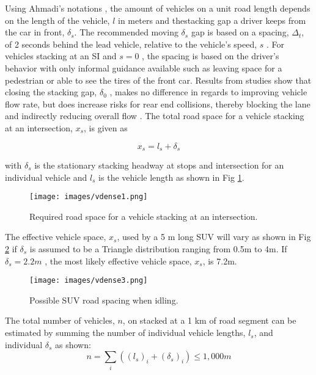 Using Ahmadi's notations \citep{Ahmadi2017}, the amount of vehicles on a unit road length depends on the length of the vehicle, $l$ in meters and thestacking gap a driver keeps from the car in front, $\delta_{s}$.  The recommended moving $\delta_{s}$ gap is based on a spacing, $\Delta_{t}$, of 2 seconds behind the lead vehicle, relative to the vehicle's speed, $s$ \citep{NYDMV2015, ukdot2017}.  For vehicles stacking at an SI and $s=0$ , the spacing is based on the driver's behavior with only informal guidance available such as leaving space for a pedestrian or able to see the tires of the front car. Results from studies show that closing the stacking gap, $\delta_{0}$ , makes no difference in regards to improving vehicle flow rate, but does increase risks for rear end collisions, thereby blocking the lane and indirectly reducing overall flow \citep{Ahmadhi2017}. The total road space for a vehicle stacking at an intersection, $x_{s}$, is given as

\begin{equation}
\label{eq:roadspace}
x_{s}= l_{s} +\delta_{s}
\end{equation}

\noindent
with $\delta_{s}$ is the stationary stacking  headway at stops and intersection for an individual vehicle and $l_{s}$ is the vehicle length as shown in Fig \ref{fig1:roadspace}.

\begin{figure}[H]
\texttt{[image: images/vdense1.png]} 
\caption{Required road space for a vehicle stacking at an intersection.}
\label{fig1:roadspace}
\end{figure}
%
 The effective vehicle space, $x_{s}$, used by a 5 m long SUV will vary as shown in Fig \ref{fig3:SUVspace} if $\delta_{s}$ is assumed to be a Triangle distribution ranging from 0.5m to 4m.  If $\delta_{s} = 2.2m$ , the most likely effective vehicle space, $x_{s}$,  is  7.2m.
%
\begin{figure}[H]
\texttt{[image: images/vdense3.png]} 
\caption{Possible SUV road spacing when idling.}
\label{fig3:SUVspace}
\end{figure}
%

The total number of vehicles, $n$, on stacked at a 1 km of road segment can be estimated by summing the number of individual vehicle lengths, $l_{s}$, and individual $\delta_{s}$ as shown:
% 
\begin{equation}
\label{eq1:roadspace}
n = \sum_{i}\left ({(l_{s})_{i} +(\delta_{s})_{i}} \right )\leq 1,000m 
\end{equation}
%

